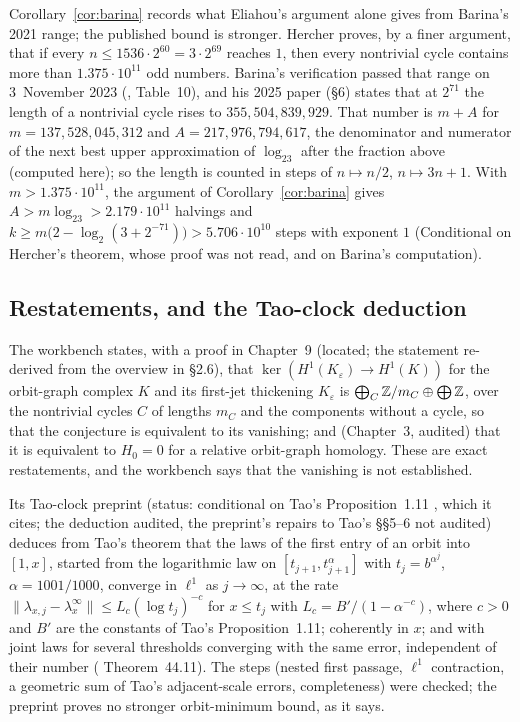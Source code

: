Corollary~\ref{cor:barina} records what Eliahou's argument alone gives from Barina's 2021 range; the published bound is stronger. Hercher \cite[Corollary~29]{Hercher} proves, by a finer argument, that if every $n\le1536\cdot2^{60}=3\cdot2^{69}$ reaches $1$, then every nontrivial cycle contains more than $1.375\cdot10^{11}$ odd numbers. Barina's verification passed that range on 3~November 2023 (\cite{Barina}, Table~10), and his 2025 paper (§6) states that at $2^{71}$ the length of a nontrivial cycle rises to $355{,}504{,}839{,}929$. That number is $m+A$ for $m=137{,}528{,}045{,}312$ and $A=217{,}976{,}794{,}617$, the denominator and numerator of the next best upper approximation of $\log_23$ after the fraction above (computed here); so the length is counted in steps of $n\mapsto n/2$, $n\mapsto3n+1$. With $m>1.375\cdot10^{11}$, the argument of Corollary~\ref{cor:barina} gives $A>m\log_23>2.179\cdot10^{11}$ halvings and $k\ge m\bigl(2-\log_2(3+2^{-71})\bigr)>5.706\cdot10^{10}$ steps with exponent $1$ (\textsf{Conditional} on Hercher's theorem, whose proof was not read, and on Barina's computation).

\subsection{Restatements, and the Tao-clock deduction}

The workbench states, with a proof in Chapter~9 (located; the statement re-derived from the overview in  §2.6), that $\ker(H^1(K_\varepsilon)\to H^1(K))$ for the orbit-graph complex $K$ and its first-jet thickening $K_\varepsilon$ is $\bigoplus_{C}\mathbb{Z}/m_C\oplus\bigoplus\mathbb{Z}$, over the nontrivial cycles $C$ of lengths $m_C$ and the components without a cycle, so that the conjecture is equivalent to its vanishing; and (Chapter~3, audited) that it is equivalent to $H_0=0$ for a relative orbit-graph homology. These are exact restatements, and the workbench says that the vanishing is not established.

Its Tao-clock preprint (status: conditional on Tao's Proposition~1.11 \cite{TaoCollatz}, which it cites; the deduction audited, the preprint's repairs to Tao's §§5--6 not audited) deduces from Tao's theorem that the laws of the first entry of an orbit into $[1,x]$, started from the logarithmic law on $[t_{j+1},t_{j+1}^{\alpha}]$ with $t_j=b^{\alpha^j}$, $\alpha=1001/1000$, converge in $\ell^1$ as $j\to\infty$, at the rate $\|\lambda_{x,j}-\lambda_x^\infty\|\le L_c(\log t_j)^{-c}$ for $x\le t_j$ with $L_c=B'/(1-\alpha^{-c})$, where $c>0$ and $B'$ are the constants of Tao's Proposition~1.11; coherently in $x$; and with joint laws for several thresholds converging with the same error, independent of their number ( Theorem~44.11). The steps (nested first passage, $\ell^1$ contraction, a geometric sum of Tao's adjacent-scale errors, completeness) were checked; the preprint proves no stronger orbit-minimum bound, as it says.

